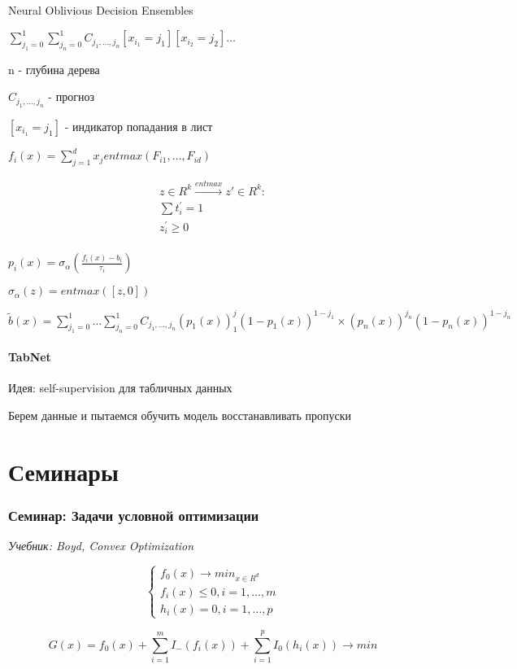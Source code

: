 \documentclass[a4paper, 12pt]{article}
\begin{document}
Neural Oblivious Decision Ensembles

\(\sum_{j_1 = 0}^1 \sum_{j_n = 0}^1 C_{j_1, \dots, j_n} [x_{i_1} = j_1][x_{i_2} = j_2]\dots\)

n - глубина дерева

\(C_{j_1, \dots, j_n}\) - прогноз

\([x_{i_1} = j_1]\) - индикатор попадания в лист

\(f_{i}(x) = \sum_{j = 1}^d x_j ent max(F_{i1}, \dots , F_{id})\)

\begin{align*}
    z \in R^k \xrightarrow{entmax} z' \in R^k: \\
    \sum t_i^{\prime} = 1 \\
    z_i^{\prime} \geq 0 \\
\end{align*}

$p_i(x) = \sigma_{\alpha} (\frac{f_i(x) - b_i}{\tau_i})$

$\sigma_{\alpha}(z) = entmax([z, 0])$

$\tilde{b}(x) = \sum_{j_1 = 0}^1 \dots \sum_{j_n = 0}^1 C_{j_1, \dots, j_n}(p_1(x))^j_1(1 - p_1(x))^{1 - j_1} \times 
(p_n(x))^{j_n}(1 - p_n(x))^{1 - j_n}$

\subsection{TabNet}

Идея: self-supervision для табличных данных

Берем данные и пытаемся 
обучить модель восстанавливать пропуски
\part{Семинары}
\section{Семинар: Задачи условной оптимизации}

\textit{Учебник: Boyd, Convex Optimization}

\[\begin{cases}
    f_0(x) \rightarrow min_{x \in R^d} \\
    f_i(x) \leq 0, i = 1, \ldots, m \\
    h_i(x) = 0, i = 1, \ldots, p
\end{cases}\]

\[G(x) = f_0(x) + \sum_{i = 1}^m I_{-}(f_i(x)) + \sum_{i = 1}^p I_0(h_i(x)) \rightarrow min\]
\end{document}
